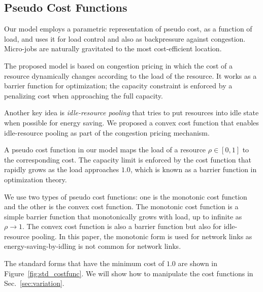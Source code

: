 \subsection{Pseudo Cost Functions}


Our model employs a parametric representation of pseudo cost, as a
function of load, and uses it for load control and also as
backpressure against congestion.
Micro-jobs are naturally gravitated to the most cost-efficient
location.

The proposed model is based on congestion pricing in which the cost of
a resource dynamically changes according to the load of the resource.
It works as a barrier function for optimization; the capacity
constraint is enforced by a penalizing cost when approaching the full
capacity.

Another key idea is {\em idle-resource pooling} that tries to put resources
into idle state when possible for energy saving.
We proposed a convex cost function that enables idle-resource pooling
as part of the congestion pricing mechanism.

A pseudo cost function in our model maps the load of a resource
$\rho \in [0, 1]$ to the corresponding cost.
The capacity limit is enforced by the cost function that rapidly grows
as the load approaches $1.0$, which is known as a barrier function in
optimization theory. 

We use two types of pseudo cost functions: one is the monotonic cost
function and the other is the convex cost function.
The monotonic cost function is a simple barrier function that
monotonically grows with load, up to infinite as $\rho \to 1$.
The convex cost function is also a barrier function but also for
idle-resource pooling.
In this paper, the monotonic form is used for network links as
energy-saving-by-idling is not common for network links.

The standard forms that have the minimum cost of $1.0$ are
shown in Figure~\ref{fig:std_costfunc}. We will show how to manipulate
the cost functions in Sec.~\ref{sec:variation}.

